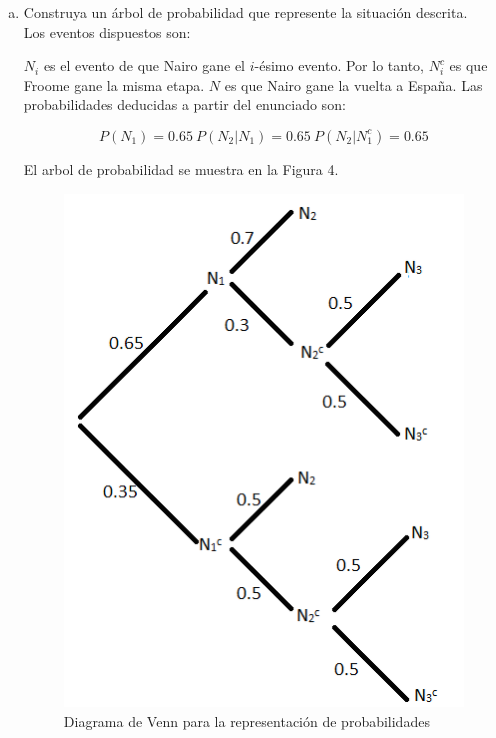 \documentclass[11pt, spanish]{article}
\begin{document}
\begin{enumerate}[(a)]

\item Construya un árbol de probabilidad que represente la situación descrita.\\ 

Los eventos dispuestos son:

$N_i$ es el evento de que Nairo gane el $i$-ésimo evento. Por lo tanto, $N_{i}^c$ es que Froome gane la misma etapa.  $N$ es que Nairo gane la vuelta a España. Las probabilidades deducidas a partir del enunciado son:

$$P(N_1) = 0.65 \ P(N_2 | N_1) = 0.65 \ P(N_2 | N_{1}^c) = 0.65$$

El arbol de probabilidad se muestra en la Figura 4.

\begin{figure}[h]
\centering
	\includegraphics[scale=0.5]{tree.png}
	\caption{Diagrama de Venn para la representación de probabilidades}
\end{figure}


\end{enumerate}
\end{document}
